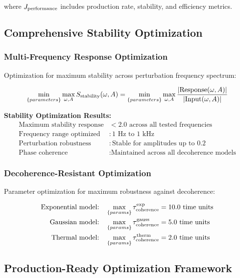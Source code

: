 \documentclass[11pt,a4paper]{article}
\begin{document}
{{{{{where $J_{\rm performance}$ includes production rate, stability, and efficiency metrics.

\subsection{Comprehensive Stability Optimization}

\subsubsection{Multi-Frequency Response Optimization}
Optimization for maximum stability across perturbation frequency spectrum:

\begin{equation}
\min_{\{parameters\}} \max_{\omega,A} S_{\rm stability}(\omega,A) = \min_{\{parameters\}} \max_{\omega,A} \frac{|\text{Response}(\omega,A)|}{|\text{Input}(\omega,A)|}
\end{equation}

\textbf{Stability Optimization Results:}
\begin{align}
\text{Maximum stability response} &< 2.0 \text{ across all tested frequencies} \\
\text{Frequency range optimized} &: 1 \text{ Hz to } 1 \text{ kHz} \\
\text{Perturbation robustness} &: \text{Stable for amplitudes up to } 0.2 \\
\text{Phase coherence} &: \text{Maintained across all decoherence models}
\end{align}

\subsubsection{Decoherence-Resistant Optimization}
Parameter optimization for maximum robustness against decoherence:

\begin{align}
\text{Exponential model:} \quad &\max_{\{params\}} \tau_{\rm coherence}^{\rm exp} = 10.0 \text{ time units} \\
\text{Gaussian model:} \quad &\max_{\{params\}} \tau_{\rm coherence}^{\rm gauss} = 5.0 \text{ time units} \\
\text{Thermal model:} \quad &\max_{\{params\}} \tau_{\rm coherence}^{\rm therm} = 2.0 \text{ time units}
\end{align}

\subsection{Production-Ready Optimization Framework}

}}}}}
\end{document}
